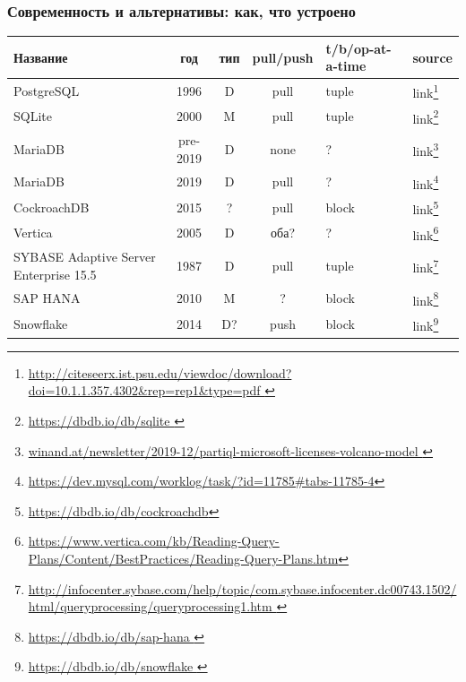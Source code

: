 \documentclass{beamer}
\begin{document}
\begin{frame}[allowframebreaks]
	\frametitle{Современность и альтернативы: как, что устроено}
	\scriptsize
	
\begin{table}	
	
\begin{longtable}{|p{2cm}|c|c|c|p{2.5cm}|p{1cm}|}
	\hline
	Название & год  & тип  & pull/push  & t/b/op-at-a-time  & source \\
	\hline
	
	PostgreSQL & 1996 & D & pull & tuple & link\footnote{\url{
		http://citeseerx.ist.psu.edu/viewdoc/download?doi=10.1.1.357.4302&rep=rep1&type=pdf }}\\


	SQLite & 2000 & M & pull & tuple & link\footnote{\url{
		https://dbdb.io/db/sqlite }}\\	
	
	MariaDB & pre-2019  & D & none  & ? & link\footnote{\url{winand.at/newsletter/2019-12/partiql-microsoft-licenses-volcano-model }} \\
	
	MariaDB & 2019  & D & pull  & ? & link\footnote{\url{https://dev.mysql.com/worklog/task/?id=11785\#tabs-11785-4}} \\
	
	CockroachDB & 2015 & ? & pull & block & link\footnote{\url{ https://dbdb.io/db/cockroachdb}}\\
	
	
	Vertica & 2005 & D & оба? & ? & link\footnote{\url{
			https://www.vertica.com/kb/Reading-Query-Plans/Content/BestPractices/Reading-Query-Plans.htm}} \\ 
		
	\hline
	
	SYBASE Adaptive Server Enterprise 15.5 & 1987 & D & pull & tuple & link\footnote{\url{
			http://infocenter.sybase.com/help/topic/com.sybase.infocenter.dc00743.1502/html/queryprocessing/queryprocessing1.htm 
	}}\\

	\hline


	SAP HANA & 2010 & M & ? & block & link\footnote{\url{https://dbdb.io/db/sap-hana 
	}}\\


	
	Snowflake & 2014 & D? & push & block & link\footnote{\url{https://dbdb.io/db/snowflake 
	}}\\

	\hline



\end{longtable}
\end{table}
\end{frame}
\end{document}
